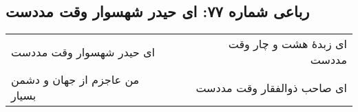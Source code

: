 \begin{center}
\section*{رباعی شماره ۷۷: ای حیدر شهسوار وقت مددست}
\label{sec:sh077}
\begin{longtable}{l p{0.5cm} r}
ای حیدر شهسوار وقت مددست
&&
ای زبدهٔ هشت و چار وقت مددست
\\
من عاجزم از جهان و دشمن بسیار
&&
ای صاحب ذوالفقار وقت مددست
\\
\end{longtable}
\end{center}
